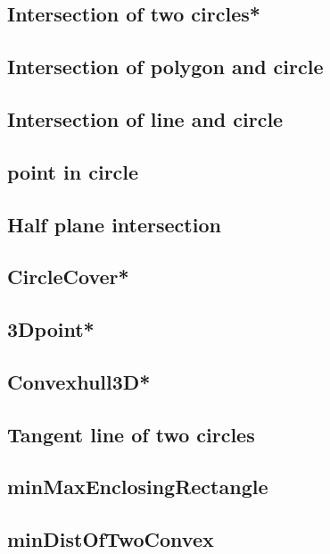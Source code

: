\subsection{Intersection of two circles*} %

\subsection{Intersection of polygon and circle}

\subsection{Intersection of line and circle}

\subsection{point in circle}

\subsection{Half plane intersection}

\subsection{CircleCover*} %

\subsection{3Dpoint*} %

\subsection{Convexhull3D*} %

\subsection{Tangent line of two circles}

\subsection{minMaxEnclosingRectangle}

\subsection{minDistOfTwoConvex}

